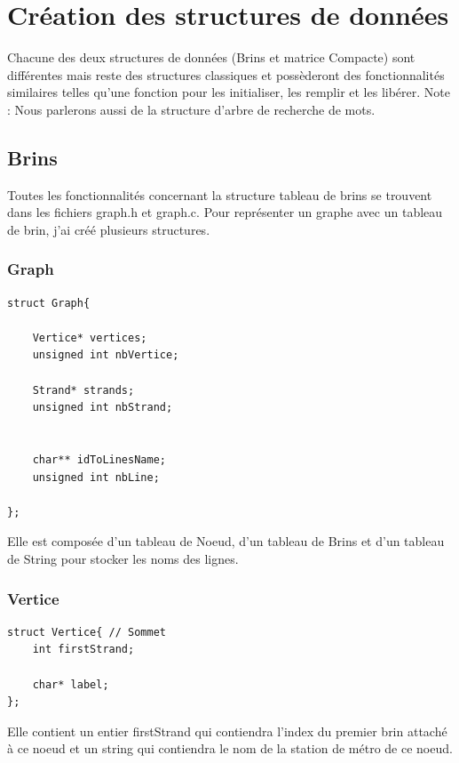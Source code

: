 \documentclass[11pt]{article}
\begin{document}
\section{Création des structures de données}
Chacune des deux structures de données (Brins et matrice Compacte) sont différentes mais reste des structures classiques et possèderont des fonctionnalités similaires telles qu'une fonction pour les initialiser, les remplir et les libérer.\newline
Note : Nous parlerons aussi de la structure d'arbre de recherche de mots.
\subsection{Brins}
Toutes les fonctionnalités concernant la structure tableau de brins se trouvent dans les fichiers graph.h et graph.c.
Pour représenter un graphe avec un tableau de brin, j'ai créé plusieurs structures.

\subsubsection{Graph}
		\begin{lstlisting}
struct Graph{

	Vertice* vertices;
	unsigned int nbVertice;

	Strand* strands;
	unsigned int nbStrand;


	char** idToLinesName;
	unsigned int nbLine;

};

\end{lstlisting}
Elle est composée d'un tableau de Noeud, d'un tableau de Brins et d'un tableau de String pour stocker les noms des lignes.\\
\subsubsection{Vertice}
\begin{lstlisting}
struct Vertice{ // Sommet
	int firstStrand;

	char* label;
};
\end{lstlisting}

Elle contient un entier firstStrand qui contiendra l'index du premier brin attaché à ce noeud et un string qui contiendra le nom de la station de métro de ce noeud.\\
\end{document}
